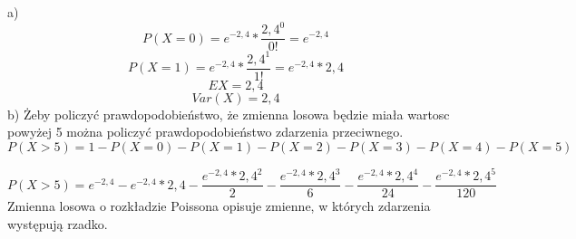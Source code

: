 \documentclass[12pt]{article}
\begin{document}
\medskip
{} 
\medskip
\newline
a)$$
P(X=0) = e^{-2,4}*\frac{2,4^{0}}{0!}=e^{-2,4}
$$
$$
P(X=1)= e^{-2,4}*\frac{2,4^{1}}{1!}=e^{-2,4}*2,4
$$
$$ 
EX=2,4
$$
$$
Var(X)=2,4
$$
\newline
b)
Żeby policzyć prawdopodobieństwo, że zmienna losowa będzie miała wartosc  powyżej 5 można policzyć prawdopodobieństwo zdarzenia przeciwnego.
$$
P(X>5)=1-P(X=0)-P(X=1)-P(X=2)-P(X=3)-P(X=4)-P(X=5)
$$

$$
P(X>5)= e^{-2,4}
-e^{-2,4}*2,4 
-\frac{e^{-2,4}*2,4^{2}}{2}- 
\frac{e^{-2,4}*2,4^{3}}{6}-
\frac{e^{-2,4}*2,4^{4}}{24}-
\frac{e^{-2,4}*2,4^{5}}{120}
$$
Zmienna losowa o rozkładzie Poissona opisuje zmienne, w których zdarzenia występują rzadko.
\end{document}

